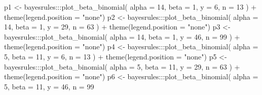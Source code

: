 \documentclass[
  11pt,
]{krantz}
\makeatletter
\newenvironment{Shaded}{\begin{snugshade}}{\end{snugshade}}
\newcommand{\AttributeTok}[1]{\textcolor[rgb]{0.61,0.61,0.61}{#1}}
\newcommand{\DecValTok}[1]{\textcolor[rgb]{0.06,0.06,0.06}{#1}}
\newcommand{\FunctionTok}[1]{\textcolor[rgb]{0,0,0}{#1}}
\newcommand{\NormalTok}[1]{#1}
\newcommand{\OtherTok}[1]{\textcolor[rgb]{0.37,0.37,0.37}{#1}}
\newcommand{\SpecialCharTok}[1]{\textcolor[rgb]{0,0,0}{#1}}
\newcommand{\StringTok}[1]{\textcolor[rgb]{0.5,0.5,0.5}{#1}}
\newenvironment{kframe}{%
\medskip{}
\setlength{\fboxsep}{.8em}
 \def\at@end@of@kframe{}%
 \ifinner\ifhmode%
  \def\at@end@of@kframe{\end{minipage}}%
  \begin{minipage}{\columnwidth}%
 \fi\fi%
 \def\FrameCommand##1{\hskip\@totalleftmargin \hskip-\fboxsep
 \colorbox{shadecolor}{##1}\hskip-\fboxsep
     \hskip-\linewidth \hskip-\@totalleftmargin \hskip\columnwidth}%
 \MakeFramed {\advance\hsize-\width
   \@totalleftmargin\z@ \linewidth\hsize
   \@setminipage}}%
 {\par\unskip\endMakeFramed%
 \at@end@of@kframe}
\renewenvironment{Shaded}{\begin{kframe}}{\end{kframe}}
\theoremstyle{definition}
\theoremstyle{definition}
\theoremstyle{definition}
\theoremstyle{definition}
\theoremstyle{remark}
\makeatother
\begin{document}
\begin{Shaded}
\begin{Highlighting}[]
\NormalTok{p1 }\OtherTok{\textless{}{-}}\NormalTok{ bayesrules}\SpecialCharTok{:::}\FunctionTok{plot\_beta\_binomial}\NormalTok{(}
  \AttributeTok{alpha =} \DecValTok{14}\NormalTok{, }\AttributeTok{beta =} \DecValTok{1}\NormalTok{, }\AttributeTok{y =} \DecValTok{6}\NormalTok{, }\AttributeTok{n =} \DecValTok{13}
\NormalTok{  ) }\SpecialCharTok{+}
  \FunctionTok{theme}\NormalTok{(}\AttributeTok{legend.position =} \StringTok{"none"}\NormalTok{) }
\NormalTok{p2 }\OtherTok{\textless{}{-}}\NormalTok{ bayesrules}\SpecialCharTok{:::}\FunctionTok{plot\_beta\_binomial}\NormalTok{(}
  \AttributeTok{alpha =} \DecValTok{14}\NormalTok{, }\AttributeTok{beta =} \DecValTok{1}\NormalTok{, }\AttributeTok{y =} \DecValTok{29}\NormalTok{, }\AttributeTok{n =} \DecValTok{63}
\NormalTok{  ) }\SpecialCharTok{+}
  \FunctionTok{theme}\NormalTok{(}\AttributeTok{legend.position =} \StringTok{"none"}\NormalTok{) }
\NormalTok{p3 }\OtherTok{\textless{}{-}}\NormalTok{ bayesrules}\SpecialCharTok{:::}\FunctionTok{plot\_beta\_binomial}\NormalTok{(}
  \AttributeTok{alpha =} \DecValTok{14}\NormalTok{, }\AttributeTok{beta =} \DecValTok{1}\NormalTok{, }\AttributeTok{y =} \DecValTok{46}\NormalTok{, }\AttributeTok{n =} \DecValTok{99}
\NormalTok{  ) }\SpecialCharTok{+}
  \FunctionTok{theme}\NormalTok{(}\AttributeTok{legend.position =} \StringTok{"none"}\NormalTok{) }
\NormalTok{p4 }\OtherTok{\textless{}{-}}\NormalTok{ bayesrules}\SpecialCharTok{:::}\FunctionTok{plot\_beta\_binomial}\NormalTok{(}
  \AttributeTok{alpha =} \DecValTok{5}\NormalTok{, }\AttributeTok{beta =} \DecValTok{11}\NormalTok{, }\AttributeTok{y =} \DecValTok{6}\NormalTok{, }\AttributeTok{n =} \DecValTok{13}
\NormalTok{  ) }\SpecialCharTok{+}
  \FunctionTok{theme}\NormalTok{(}\AttributeTok{legend.position =} \StringTok{"none"}\NormalTok{) }
\NormalTok{p5 }\OtherTok{\textless{}{-}}\NormalTok{ bayesrules}\SpecialCharTok{:::}\FunctionTok{plot\_beta\_binomial}\NormalTok{(}
  \AttributeTok{alpha =} \DecValTok{5}\NormalTok{, }\AttributeTok{beta =} \DecValTok{11}\NormalTok{, }\AttributeTok{y =} \DecValTok{29}\NormalTok{, }\AttributeTok{n =} \DecValTok{63}
\NormalTok{  ) }\SpecialCharTok{+}
  \FunctionTok{theme}\NormalTok{(}\AttributeTok{legend.position =} \StringTok{"none"}\NormalTok{) }
\NormalTok{p6 }\OtherTok{\textless{}{-}}\NormalTok{ bayesrules}\SpecialCharTok{:::}\FunctionTok{plot\_beta\_binomial}\NormalTok{(}
  \AttributeTok{alpha =} \DecValTok{5}\NormalTok{, }\AttributeTok{beta =} \DecValTok{11}\NormalTok{, }\AttributeTok{y =} \DecValTok{46}\NormalTok{, }\AttributeTok{n =} \DecValTok{99}

\end{Highlighting}
\end{Shaded}
\end{document}
